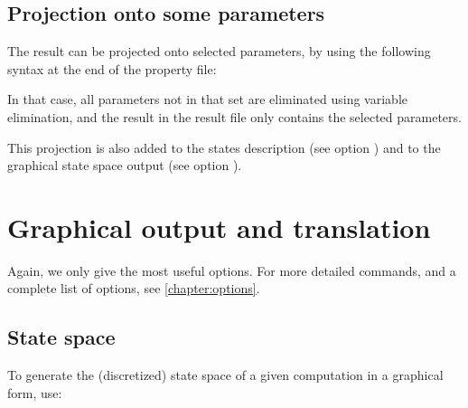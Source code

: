 \section{Projection onto some parameters}\label{section:projection}
The result can be projected onto selected parameters, by using the following syntax at the end of the property file:


In that case, all parameters not in that set are eliminated using variable elimination, and the result in the result file only contains the selected parameters.

This projection is also added to the states description (see option ) and to the graphical state space output (see option ).






\chapter{Graphical output and translation}


Again, we only give the most useful options.
For more detailed commands, and a complete list of options, see \cref{chapter:options}.

\section{State space}

To generate the (discretized) state space of a given computation in a graphical form, use:


